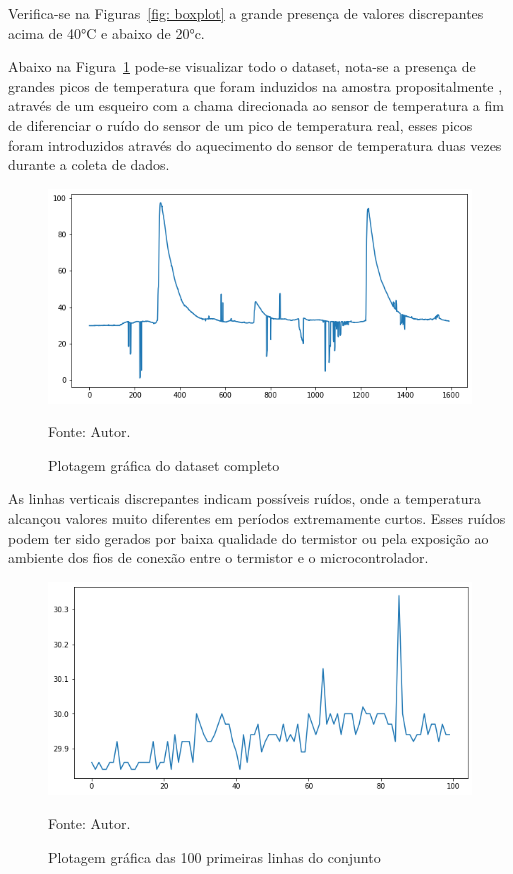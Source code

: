 Verifica-se na Figuras~\ref{fig: boxplot} a grande presença de valores discrepantes acima de \ang{40}C e abaixo de \ang{20}c.

Abaixo na Figura~\ref{fig: bruto} pode-se visualizar todo o dataset, nota-se a presença de grandes picos de temperatura que foram induzidos na amostra propositalmente , através de um esqueiro com a chama direcionada ao sensor de temperatura a fim de diferenciar o ruído do sensor de um pico de temperatura real, esses picos foram introduzidos através do aquecimento do sensor de temperatura duas vezes durante a coleta de dados.


\begin{figure}[H]
	\centering
	\includegraphics[width=15cm]{imagens/sensores/bruto.png}
	\caption{Plotagem gráfica do dataset completo}
	Fonte: Autor.
	\label{fig: bruto}
\end{figure}

As linhas verticais discrepantes indicam possíveis ruídos, onde a temperatura alcançou valores muito diferentes em períodos extremamente curtos. Esses ruídos podem ter sido gerados por baixa qualidade do termistor ou pela exposição ao ambiente dos fios de conexão entre o termistor e o microcontrolador.


\begin{figure}[H]
	\centering
	\includegraphics[width=15cm]{imagens/sensores/bruto_100_primeiras}
	\caption{Plotagem gráfica das 100 primeiras linhas do conjunto}
	Fonte: Autor.
	\label{fig: bruto_100p}
\end{figure}

